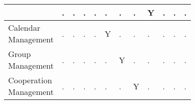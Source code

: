 {\begin{table}[htbp]
\begin{tabular}{|p{6.3em}|p{2em}|p{2em}|p{2em}|p{2em}|p{2em}|
                            p{2em}|p{2em}|p{2em}|p{2em}|p{2em}|p{2em}|}
                                    & .   & .     & . 
                                    & .   & .     & .
                                    & .   & Y     & .
                                    & .   & .     \\
                \hline
                \tabincell{l}{Calendar \\ Management}
                       & .   & .     & .
                                    & .   & Y     & .
                                    & .   & .     & .
                                    & .   & .     \\
                \hline
                \tabincell{l}{Group \\ Management}
                       & .   & .     & . 
                                    & .   & .     & Y
                                    & .   & .     & .
                                    & .   & .     \\
                \hline
                \tabincell{l}{Cooperation \\ Management }
                 
                                    & .   & .     & . 
                                    & .   & .     & .
                                    & Y   & .     & .
                                    & .   & .     \\
                \hline
            \end{tabular}
        \end{table}
}

